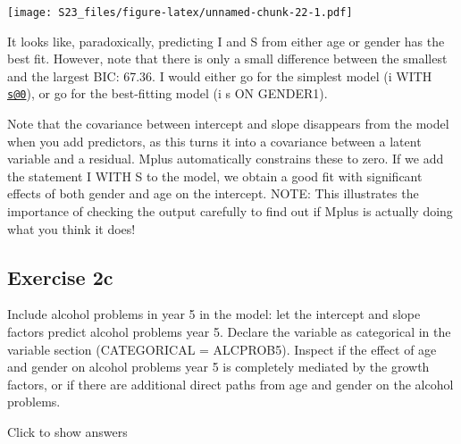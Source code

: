 \documentclass[
]{book}
\newenvironment{Shaded}{\begin{snugshade}}{\end{snugshade}}
\newcommand{\AttributeTok}[1]{\textcolor[rgb]{0.77,0.63,0.00}{#1}}
\newcommand{\CommentTok}[1]{\textcolor[rgb]{0.56,0.35,0.01}{\textit{#1}}}
\newcommand{\DecValTok}[1]{\textcolor[rgb]{0.00,0.00,0.81}{#1}}
\newcommand{\FunctionTok}[1]{\textcolor[rgb]{0.00,0.00,0.00}{#1}}
\newcommand{\NormalTok}[1]{#1}
\newcommand{\SpecialCharTok}[1]{\textcolor[rgb]{0.00,0.00,0.00}{#1}}
\begin{document}
\begin{Shaded}
\end{Shaded}

\texttt{[image: S23\_files/figure-latex/unnamed-chunk-22-1.pdf]}

It looks like, paradoxically, predicting I and S from either age or gender
has the best fit. However, note that there is only a small difference between
the smallest and the largest BIC: 67.36.
I would either go for the simplest model (i WITH \href{mailto:s@0}{\nolinkurl{s@0}}), or go for the
best-fitting model (i s ON GENDER1).

Note that the covariance
between intercept and slope disappears from the model when you add predictors, as
this turns it into a covariance
between a latent variable and a residual. Mplus automatically constrains these to zero.
If we add the statement I WITH S to the model, we obtain a good fit with significant effects of both gender and age on the intercept.
NOTE: This illustrates the importance of checking the output carefully to find out if Mplus is
actually doing what you think it does!

\hypertarget{exercise-2c}{%
\subsection{Exercise 2c}\label{exercise-2c}}

Include alcohol problems in year 5 in the model: let the intercept and slope factors predict alcohol problems year 5. Declare the variable as categorical in the variable section (CATEGORICAL = ALCPROB5).
Inspect if the effect of age and gender on alcohol problems year 5 is completely mediated by the growth
factors, or if there are additional direct paths from age and gender on the alcohol problems.

Click to show answers
\end{document}
